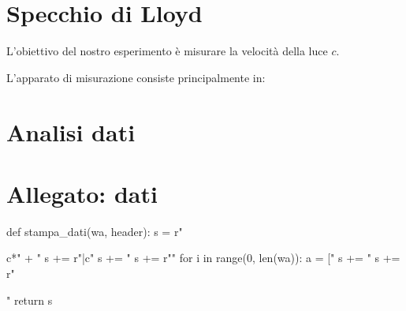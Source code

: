 \section{Specchio di Lloyd}
L'obiettivo del nostro esperimento è misurare la velocità della luce $c$.

L'apparato di misurazione consiste principalmente in:

\section{Analisi dati}

\section{Allegato: dati}
\begin{sagesilent}
def stampa_dati(wa, header):
  s = r"\begin{tabular}{c*{" + "%
  s += r"}{|c}}"
  s += "%
  s += r"\midrule"
  for i in range(0, len(wa)):
    a = ["%
    s += "%
  s += r"\end{tabular}"
  return s
\end{sagesilent}

\begin{center}

\end{center}

